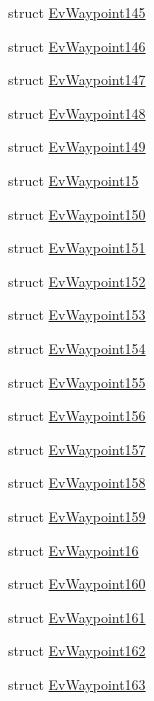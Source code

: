 \begin{DoxyCompactItemize}
struct \hyperlink{structmove__base__z__client_1_1EvWaypoint145}{Ev\+Waypoint145}
\item 
struct \hyperlink{structmove__base__z__client_1_1EvWaypoint146}{Ev\+Waypoint146}
\item 
struct \hyperlink{structmove__base__z__client_1_1EvWaypoint147}{Ev\+Waypoint147}
\item 
struct \hyperlink{structmove__base__z__client_1_1EvWaypoint148}{Ev\+Waypoint148}
\item 
struct \hyperlink{structmove__base__z__client_1_1EvWaypoint149}{Ev\+Waypoint149}
\item 
struct \hyperlink{structmove__base__z__client_1_1EvWaypoint15}{Ev\+Waypoint15}
\item 
struct \hyperlink{structmove__base__z__client_1_1EvWaypoint150}{Ev\+Waypoint150}
\item 
struct \hyperlink{structmove__base__z__client_1_1EvWaypoint151}{Ev\+Waypoint151}
\item 
struct \hyperlink{structmove__base__z__client_1_1EvWaypoint152}{Ev\+Waypoint152}
\item 
struct \hyperlink{structmove__base__z__client_1_1EvWaypoint153}{Ev\+Waypoint153}
\item 
struct \hyperlink{structmove__base__z__client_1_1EvWaypoint154}{Ev\+Waypoint154}
\item 
struct \hyperlink{structmove__base__z__client_1_1EvWaypoint155}{Ev\+Waypoint155}
\item 
struct \hyperlink{structmove__base__z__client_1_1EvWaypoint156}{Ev\+Waypoint156}
\item 
struct \hyperlink{structmove__base__z__client_1_1EvWaypoint157}{Ev\+Waypoint157}
\item 
struct \hyperlink{structmove__base__z__client_1_1EvWaypoint158}{Ev\+Waypoint158}
\item 
struct \hyperlink{structmove__base__z__client_1_1EvWaypoint159}{Ev\+Waypoint159}
\item 
struct \hyperlink{structmove__base__z__client_1_1EvWaypoint16}{Ev\+Waypoint16}
\item 
struct \hyperlink{structmove__base__z__client_1_1EvWaypoint160}{Ev\+Waypoint160}
\item 
struct \hyperlink{structmove__base__z__client_1_1EvWaypoint161}{Ev\+Waypoint161}
\item 
struct \hyperlink{structmove__base__z__client_1_1EvWaypoint162}{Ev\+Waypoint162}
\item 
struct \hyperlink{structmove__base__z__client_1_1EvWaypoint163}{Ev\+Waypoint163}

\end{DoxyCompactItemize}
